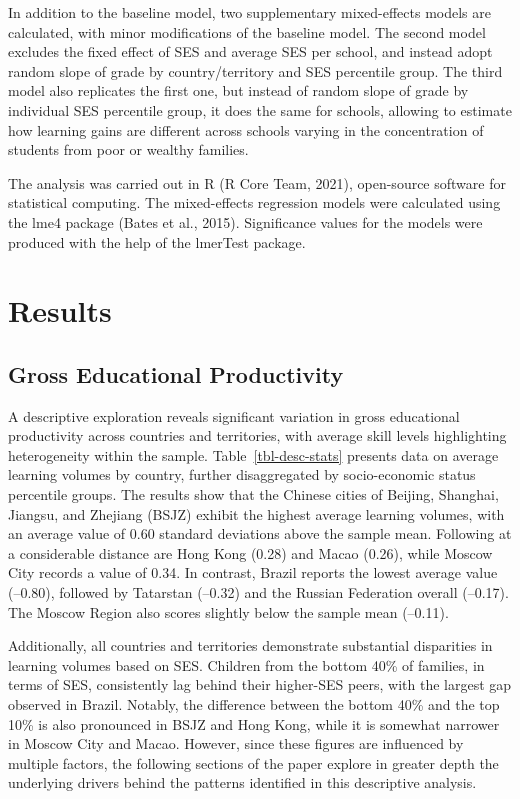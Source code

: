 \documentclass[
]{article}
\begin{document}
In addition to the baseline model, two supplementary mixed-effects
models are calculated, with minor modifications of the baseline model.
The second model excludes the fixed effect of SES and average SES per
school, and instead adopt random slope of grade by country/territory and
SES percentile group. The third model also replicates the first one, but
instead of random slope of grade by individual SES percentile group, it
does the same for schools, allowing to estimate how learning gains are
different across schools varying in the concentration of students from
poor or wealthy families.

The analysis was carried out in R (R Core Team, 2021), open-source
software for statistical computing. The mixed-effects regression models
were calculated using the lme4 package (Bates et al., 2015).
Significance values for the models were produced with the help of the
lmerTest package.

\section{Results}\label{results}

\subsection{Gross Educational
Productivity}\label{gross-educational-productivity}

A descriptive exploration reveals significant variation in gross
educational productivity across countries and territories, with average
skill levels highlighting heterogeneity within the sample.
Table~\ref{tbl-desc-stats} presents data on average learning volumes by
country, further disaggregated by socio-economic status percentile
groups. The results show that the Chinese cities of Beijing, Shanghai,
Jiangsu, and Zhejiang (BSJZ) exhibit the highest average learning
volumes, with an average value of 0.60 standard deviations above the
sample mean. Following at a considerable distance are Hong Kong (0.28)
and Macao (0.26), while Moscow City records a value of 0.34. In
contrast, Brazil reports the lowest average value (--0.80), followed by
Tatarstan (--0.32) and the Russian Federation overall (--0.17). The
Moscow Region also scores slightly below the sample mean (--0.11).

Additionally, all countries and territories demonstrate substantial
disparities in learning volumes based on SES. Children from the bottom
40\% of families, in terms of SES, consistently lag behind their
higher-SES peers, with the largest gap observed in Brazil. Notably, the
difference between the bottom 40\% and the top 10\% is also pronounced
in BSJZ and Hong Kong, while it is somewhat narrower in Moscow City and
Macao. However, since these figures are influenced by multiple factors,
the following sections of the paper explore in greater depth the
underlying drivers behind the patterns identified in this descriptive
analysis.
\end{document}
